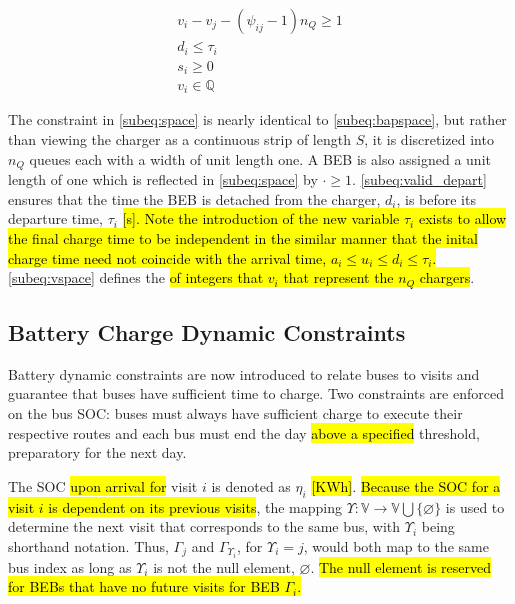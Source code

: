 \documentclass[utf8]{FrontiersinHarvard}
\begin{document}
\begin{subequations}
\label{eq:packconstrs}
\begin{align}
    v_i - v_j - (\psi_{ij} - 1)n_Q \geq 1 \label{subeq:space} \\ d_i \leq \tau_i \label{subeq:valid_depart} \\ s_i \geq
    0 \label{subeq:pos_charge} \\ v_i \in \mathbb{Q} \label{subeq:vspace}
\end{align}
\end{subequations}

The constraint in \autoref{subeq:space} is nearly identical to \autoref{subeq:bapspace}, but rather than viewing the
charger as a continuous strip of length \(S\), it is discretized into \(n_Q\) queues each with a width of unit length one. A
BEB is also assigned a unit length of one which is reflected in \autoref{subeq:space} by \(\cdot \geq 1\).
\autoref{subeq:valid_depart} ensures that the time the BEB is detached from the charger, \(d_i\), is before its departure
time, \(\tau_i\) \hl{[s]. Note the introduction of the new variable $\tau_i$ exists to allow the final charge time to be independent in the similar manner that the inital charge time need not coincide with the arrival time, $a_i \le u_i \le d_i \le \tau_i$.} \autoref{subeq:vspace} defines the \hl{of integers that $v_i$ that represent the $n_Q$ chargers}.

\subsection{Battery Charge Dynamic Constraints}
\label{sec:batt_dynamics}
Battery dynamic constraints are now introduced to relate buses to visits and guarantee that buses have sufficient time
to charge. Two constraints are enforced on the bus SOC: buses must always have sufficient charge to execute their
respective routes and each bus must end the day \hl{above a specified} threshold, preparatory for the next
day.

The SOC \hl{upon arrival for} visit \(i\) is denoted as \(\eta_i\) \hl{[KWh]}. \hl{Because the SOC for a visit $i$ is dependent on its previous visits}, the mapping \(\Upsilon: \mathbb{V} \rightarrow \mathbb{V} \bigcup \{\varnothing\}\) is
used to determine the next visit that corresponds to the same bus, with \(\Upsilon_i\) being shorthand notation. Thus, \(\Gamma_j\) and
\(\Gamma_{\Upsilon_i}\), for \(\Upsilon_i = j\), would both map to the same bus index as long as \(\Upsilon_i\) is not the null element, \(\varnothing\).
\hl{The null element is reserved for BEBs that have no future visits for BEB $\Gamma_i$.}
\end{document}
